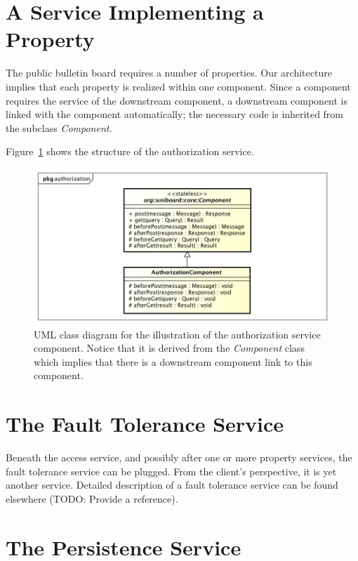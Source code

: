 \documentclass[oneside]{scrreprt}
\newcommand{\fig}[1]{Figure~\ref{#1}}
\begin{document}
\section{A Service Implementing a Property}

The public bulletin board requires a number of properties. Our
architecture implies that each property is realized within
one component. Since a component requires the service of
the downstream component, a downstream component is
linked with the component automatically; the necessary
code is inherited from the subclass \emph{Component}.

\fig{fig:authorization-service} shows the structure of
the authorization service.

\begin{figure}[ht]
\centerline{
\includegraphics[width=1.0\textwidth]{figs/authorization-service}}
\caption{UML class diagram for the illustration of the
authorization service component. Notice that it is derived
from the \emph{Component} class which implies that there
is a downstream component link to this component.}
\label{fig:authorization-service}
\end{figure}


\section{The Fault Tolerance Service}

Beneath the access service, and possibly after one or
more property services, the fault tolerance service can
be plugged. From the client's perspective, it is
yet another service. Detailed description of a
fault tolerance service can be found elsewhere (TODO: Provide a reference).


\section{The Persistence Service}
\end{document}
